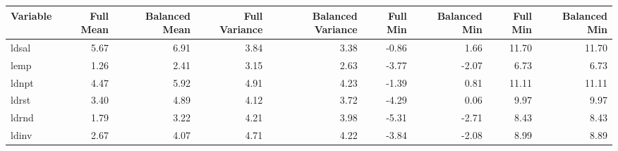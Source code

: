 \begin{tabular}{lrrrrrrrr}
  \hline
Variable & Full Mean & Balanced Mean & Full Variance & Balanced Variance & Full Min & Balanced Min & Full Min & Balanced Min \\ 
  \hline
ldsal & 5.67 & 6.91 & 3.84 & 3.38 & -0.86 & 1.66 & 11.70 & 11.70 \\ 
  lemp & 1.26 & 2.41 & 3.15 & 2.63 & -3.77 & -2.07 & 6.73 & 6.73 \\ 
  ldnpt & 4.47 & 5.92 & 4.91 & 4.23 & -1.39 & 0.81 & 11.11 & 11.11 \\ 
  ldrst & 3.40 & 4.89 & 4.12 & 3.72 & -4.29 & 0.06 & 9.97 & 9.97 \\ 
  ldrnd & 1.79 & 3.22 & 4.21 & 3.98 & -5.31 & -2.71 & 8.43 & 8.43 \\ 
  ldinv & 2.67 & 4.07 & 4.71 & 4.22 & -3.84 & -2.08 & 8.99 & 8.89 \\ 
   \hline
\end{tabular}

